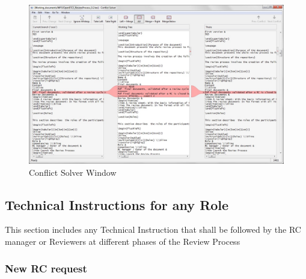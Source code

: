\documentclass{template/openetcs_article}
\begin{document}
\begin{figure}
\centering
\includegraphics[width=\textwidth]{./figures/ConflictSolverWindow.JPG}
\caption{Conflict Solver Window}
\end{figure}

\subsection{Technical Instructions for any Role}
This section includes any Technical Instruction that shall be followed by the RC manager or Reviewers at different phases of the Review Process

\subsubsection{New RC request}
\end{document}
